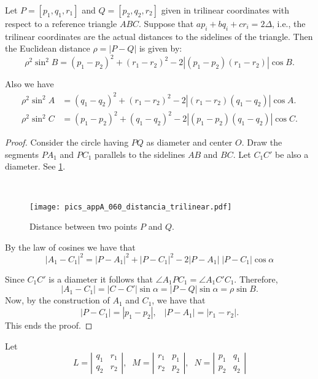 \begin{proposition} Let $P =[p_1,q_1,r_1]$ and $Q=[p_2,q_2,r_2] $ given in trilinear coordinates with respect to
	a reference triangle $ABC$. Suppose that $ap_i+bq_i+cr_i=2\Delta$, i.e., the trilinear coordinates are the actual distances to the sidelines of the triangle.
	Then the  Euclidean distance  $\rho=|P -Q|$ is given by:
		\[ \rho^2\sin^2 B =(p_1-p_2)^2+(r_1-r_2)^2-2|(p_1-p_2)(r_1-r_2)|\cos B.\]
	
	Also we have 
	\begin{align*}
		  \rho^2\sin^2 A&=(q_1-q_2)^2+(r_1-r_2)^2- 2|(r_1-r_2)(q_1-q_2)|\cos A.\\
		 \rho^2\sin^2 C&=(p_1-p_2)^2+(q_1-q_2)^2- 2|(p_1-p_2)(q_1-q_2)|\cos C.	
	\end{align*}
\label{prop:distancePQ}
	\end{proposition}

\begin{proof}
	Consider the  circle  having $PQ$ as diameter and center $O$.   Draw the segments $PA_1$ and $PC_1$ parallels to the sidelines $AB$ and $BC$. Let $C_1C'$ be also a diameter. See  \cref{fig:distance_tri}.
		\begin{figure}[H]\ 
		\begin{center}
			\texttt{[image: pics\_appA\_060\_distancia\_trilinear.pdf]}
			\caption { \label{fig:distance_tri}   Distance between two points $P$ and $Q$.}
		\end{center}
	\end{figure}
By the law of cosines we have that
\[ |A_1-C_1|^2=|P-A_1|^2+|P-C_1|^2-2|P-A_1| \;|P-C_1| \cos \alpha \]

Since $C_1C'$ is a diameter it follows that $\angle A_1PC_1=\angle A_1C'C_1$. Therefore,
\[  |A_1-C_1|=|C-C'| \sin\alpha= |P-Q|\sin\alpha= \rho \sin B.\]
Now, by the construction of $A_1$ and $C_1$, we have that
\[ |P-C_1|= |p_1-p_2|,\;\;\;  |P-A_1|=| r_1-r_2|.\]
	This ends the proof.
\end{proof}

Let \[L=\left| \begin{matrix} q_1&r_1\\
q_2&r_2 \end{matrix} \right|, \;\;M=\left| \begin{matrix} r_1&p_1\\
r_2&p_2 \end{matrix} \right|,\;\; N=\left| \begin{matrix} p_1&q_1\\
p_2&q_2 \end{matrix} \right|   \]

